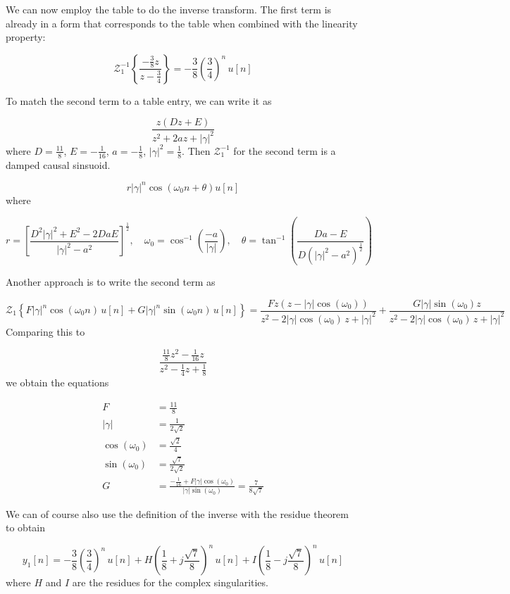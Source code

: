 \documentclass{article}
\begin{document}
We can now employ the table to do the inverse transform. The first term is already in a form that corresponds to the table when combined with the linearity property:

\[
\mathcal{Z}_1^{-1}\left\{ \frac{-\frac{3}{8}z}{z-\frac{3}{4}} \right\} = -\frac{3}{8}\left( \frac{3}{4}\right)^n\, u[n] 
\]

To match the second term to a table entry, we can write it as

\[
\frac{z(Dz + E)}{z^2 + 2az + |\gamma|^2}
\]
where $D=\frac{11}{8}$, $E=-\frac{1}{16}$, $a=-\frac{1}{8}$, $|\gamma|^2 = \frac{1}{8}$. Then $\mathcal{Z}_1^{-1}$ for the second term is a damped causal sinsuoid.

\[
r |\gamma|^n \cos(\omega_0 n + \theta) u[n]
\]
where

\[
r = \left[\frac{D^2|\gamma |^2 + E^2-2DaE}{|\gamma |^2 - a^2}\right]^{\frac{1}{2}},\quad \omega_0 = \cos^{-1}\left(\frac{-a}{|\gamma |} \right), \quad \theta = \tan^{-1}\left(\frac{Da-E}{D(|\gamma |^2-a^2)^{\frac{1}{2}}}\right)
\]

Another approach is to write the second term as

\[
\mathcal{Z}_1 \left\{ F|\gamma|^n\cos(\omega_0 n)\, u[n] +  G|\gamma|^n\sin(\omega_0 n)\, u[n]\right\} = \frac{Fz(z-|\gamma |\cos(\omega_0))}{z^2 -2|\gamma |\cos(\omega_0)\, z + |\gamma |^2} + \frac{G |\gamma |\sin(\omega_0)z}{z^2 -2|\gamma |\cos(\omega_0)\, z + |\gamma |^2} 
\]
Comparing this to

\[
\frac{\frac{11}{8}z^2 -\frac{1}{16}z}{z^2 - \frac{1}{4}z + \frac{1}{8}}
\]
we obtain the equations

\begin{align*}
  F &= \frac{11}{8}\\
    |\gamma | &= \frac{1}{2\sqrt{2}}\\
  \cos(\omega_0) &= \frac{\sqrt{2}}{4}\\
  \sin(\omega_0) &= \frac{\sqrt{7}}{2\sqrt{2}}\\
  G &= \frac{-\frac{1}{16} + F|\gamma | \cos(\omega_0)}{|\gamma | \sin(\omega_0)} = \frac{7}{8 \sqrt{7}}
\end{align*}

We can of course also use the definition of the inverse with the residue theorem to obtain

\[
y_1[n] = -\frac{3}{8}\left( \frac{3}{4}\right)^n\, u[n] + H\left(\frac{1}{8} + j \frac{\sqrt{7}}{8}\right)^n\, u[n] + I \left(\frac{1}{8} - j \frac{\sqrt{7}}{8}\right)^n\, u[n]
\]
where $H$ and $I$ are the residues for the complex singularities.
\end{document}
